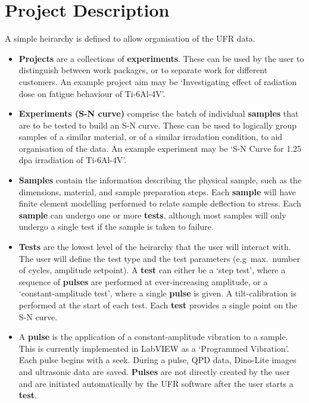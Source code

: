 \documentclass[a4paper]{article}
\begin{document}
\section*{Project Description}

A simple heirarchy is defined to allow organisation of the UFR data.


\begin{itemize}
  \item{
    \textbf{Projects} are a collections of \textbf{experiments}.
    These can be used by the user to distinguish between work packages, or to separate work for different customers.
    An example project aim may be `Investigating effect of radiation dose on fatigue behaviour of Ti-6Al-4V'.
  }
  \item{
    \textbf{Experiments (S-N curve)} comprise the batch of individual \textbf{samples} that are to be tested to build an S-N curve.
    These can be used to logically group samples of a similar material, or of a similar irradation condition, to aid organisation of the data.
    An example experiment may be `S-N Curve for 1.25 dpa irradiation of Ti-6Al-4V'.
  }
  \item{
    \textbf{Samples} contain the information describing the physical sample, such as the dimensions, material, and sample preparation steps.
    Each \textbf{sample} will have finite element modelling performed to relate sample deflection to stress.
    Each \textbf{sample} can undergo one or more \textbf{tests}, although most samples will only undergo a single test if the sample is taken to failure.
  }
  \item{
    \textbf{Tests} are the lowest level of the heirarchy that the user will interact with. The user will define the test type and the test parameters (e.g\ max.\ number of cycles, amplitude setpoint).
    A \textbf{test} can either be a `step test', where a sequence of \textbf{pulses} are performed at ever-increasing amplitude, or a `constant-amplitude test', where a single \textbf{pulse} is given.
    A tilt-calibration is performed at the start of each test.
    Each \textbf{test} provides a single point on the S-N curve.
  }
  \item{
    A \textbf{pulse} is the application of a constant-amplitude vibration to a sample.
    This is currently implemented in LabVIEW as a `Programmed Vibration'.
    Each pulse begins with a seek.
    During a pulse, QPD data, Dino-Lite images and ultrasonic data are saved.
    \textbf{Pulses} are not directly created by the user and are initiated automatically by the UFR software after the user starts a \textbf{test}.
  }  
\end{itemize}
\end{document}

